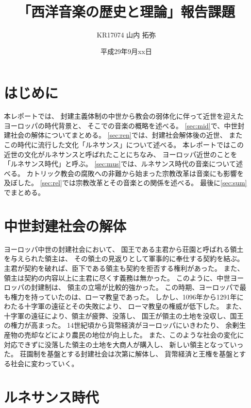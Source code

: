 \documentclass[a4j]{jarticle}
\title{「西洋音楽の歴史と理論」報告課題}
\author{KR17074 山内 拓弥}
\date{平成29年9月xx日}
\begin{document}

\section{はじめに}

本レポートでは、
封建主義体制の中世から教会の弱体化に伴って近世を迎えたヨーロッパの時代背景と、
そこでの音楽の概略を述べる。
\ref{sec:mid}で、中世封建社会の解体についてまとめる。
\ref{sec:ren}では、封建社会解体後の近世、
またこの時代に流行した文化「ルネサンス」について述べる。
本レポートではこの近世の文化がルネサンスと呼ばれたことにちなみ、
ヨーロッパ近世のことを「ルネサンス時代」と呼ぶ。
\ref{sec:mus}では、ルネサンス時代の音楽について述べる。
カトリック教会の腐敗への非難から始まった宗教改革は音楽にも影響を及ぼした。
\ref{sec:rel}では宗教改革とその音楽との関係を述べる。
最後に\ref{sec:sum}でまとめる。

\section{中世封建社会の解体\label{sec:mid}}

\large

ヨーロッパ中世の封建社会において、
国王である主君から荘園と呼ばれる領土を与えられた領主は、
その領土の見返りとして軍事的に奉仕する契約を結ぶ。
主君が契約を破れば、臣下である領主も契約を拒否する権利があった。
また、領主は契約の内容以上に主君に尽くす義務は無かった。
このように、中世ヨーロッパの封建制は、
領主の立場が比較的強かった。
この時期、ヨーロッパで最も権力を持っていたのは、ローマ教皇であった。
しかし、1096年から1291年にわたる十字軍の遠征とその失敗により、
ローマ教皇の権威が低下した。
また、十字軍の遠征により、領主が疲弊、没落し、
国王が領主の土地を没収し、国王の権力が高まった。
14世紀頃から貨幣経済がヨーロッパにいきわたり、
余剰生産物の売却などにより農民の地位が向上した。
また、このような社会の変化に対応できずに没落した領主の土地を大商人が購入し、
新しい領主となっていった。
荘園制を基盤とする封建社会は次第に解体し、
貨幣経済と王権を基盤とする社会に変わっていく。

\section{ルネサンス時代\label{sec:ren}}
\end{document}
